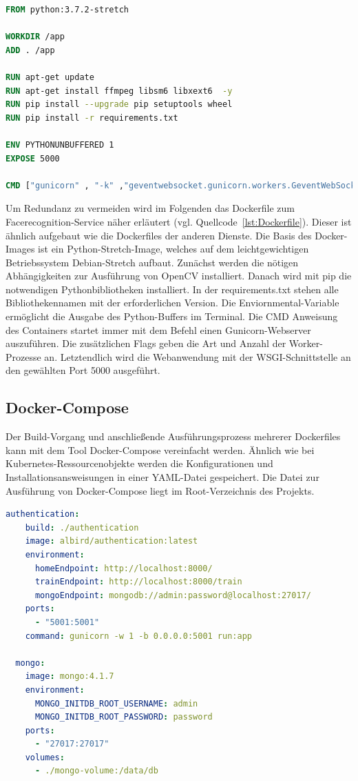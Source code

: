 \begin{lstlisting}[caption={Dockerfile},captionpos=b ,label={lst:Dockerfile},language=Dockerfile]
FROM python:3.7.2-stretch

WORKDIR /app
ADD . /app

RUN apt-get update
RUN apt-get install ffmpeg libsm6 libxext6  -y
RUN pip install --upgrade pip setuptools wheel
RUN pip install -r requirements.txt

ENV PYTHONUNBUFFERED 1
EXPOSE 5000

CMD ["gunicorn" , "-k" ,"geventwebsocket.gunicorn.workers.GeventWebSocketWorker", "-w", "3" , "--bind" , ":5000" , "run:app"]
\end{lstlisting}

Um Redundanz zu vermeiden wird im Folgenden das Dockerfile zum Facerecognition-Service näher erläutert (vgl. Quellcode~\ref{lst:Dockerfile}).
Dieser ist ähnlich aufgebaut wie die Dockerfiles der anderen Dienste.
Die Basis des Docker-Images ist ein Python-Stretch-Image, welches auf dem leichtgewichtigen Betriebssystem Debian-Stretch aufbaut.
Zunächst werden die nötigen Abhängigkeiten zur Ausführung von OpenCV installiert.
Danach wird mit pip die notwendigen Pythonbibliotheken installiert.
In der requirements.txt stehen alle Bibliothekennamen mit der erforderlichen Version.
Die Enviornmental-Variable ermöglicht die Ausgabe des Python-Buffers im Terminal.
Die CMD Anweisung des Containers startet immer mit dem Befehl einen Gunicorn-Webserver auszuführen.
Die zusätzlichen Flags geben die Art und Anzahl der Worker-Prozesse an.
Letztendlich wird die Webanwendung mit der WSGI-Schnittstelle an den gewählten Port 5000 ausgeführt.

\subsection{Docker-Compose}

Der Build-Vorgang und anschließende Ausführungsprozess mehrerer Dockerfiles kann mit dem Tool Docker-Compose vereinfacht werden.
Ähnlich wie bei Kubernetes-Ressourcenobjekte werden die Konfigurationen und Installationsansweisungen in einer YAML-Datei gespeichert.
Die Datei zur Ausführung von Docker-Compose liegt im Root-Verzeichnis des Projekts.

\begin{lstlisting}[caption={Ausschnit aus dem docker-compose.yaml},captionpos=b ,label={lst:docker-compose.yaml},language=yaml]
  authentication:
    build: ./authentication
    image: albird/authentication:latest
    environment:
      homeEndpoint: http://localhost:8000/
      trainEndpoint: http://localhost:8000/train 
      mongoEndpoint: mongodb://admin:password@localhost:27017/
    ports:
      - "5001:5001"
    command: gunicorn -w 1 -b 0.0.0.0:5001 run:app

  mongo:
    image: mongo:4.1.7
    environment:
      MONGO_INITDB_ROOT_USERNAME: admin
      MONGO_INITDB_ROOT_PASSWORD: password
    ports:
      - "27017:27017"
    volumes:
      - ./mongo-volume:/data/db
\end{lstlisting}


